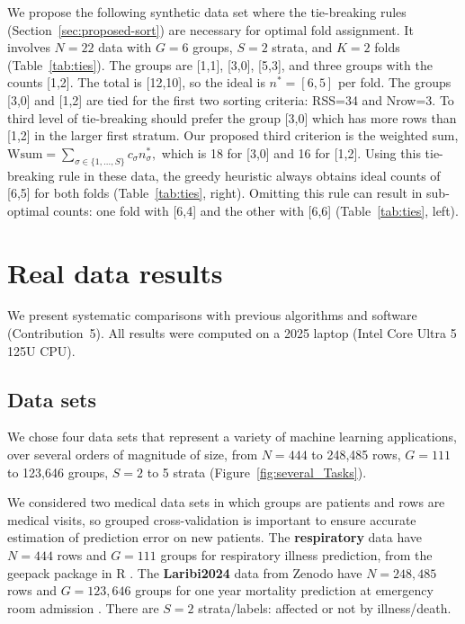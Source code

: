 \documentclass[twoside]{article}
\begin{document}
We propose the following synthetic data set where the tie-breaking rules (Section~\ref{sec:proposed-sort}) are necessary for optimal fold assignment.
It involves $N=22$ data with $G=6$ groups, $S=2$ strata, and $K=2$ folds (Table~\ref{tab:ties}).
The groups are [1,1], [3,0],  [5,3], and three groups with the counts [1,2].
The total is [12,10], so the ideal is $n^*=[6,5]$ per fold.
The groups [3,0] and [1,2] are tied for the first two sorting criteria: RSS=34 and Nrow=3.
To third level of tie-breaking should prefer the group [3,0] which has more rows than [1,2] in the larger first stratum.
Our proposed third criterion is the weighted sum,
$\text{Wsum}=
\sum_{\sigma\in\{1,\dots,S\}}
c_{\sigma}n^*_\sigma,
$
which is 18 for [3,0] and 16 for [1,2].
Using this tie-breaking rule in these data, the greedy heuristic always obtains ideal counts of [6,5] for both folds (Table~\ref{tab:ties}, right).
Omitting this rule can result in sub-optimal counts: one fold with [6,4] and the other with [6,6] (Table~\ref{tab:ties}, left).

\section{Real data results}
\label{sec:results}
We present systematic comparisons with previous algorithms and software (Contribution~5).
All results were computed on a 2025 laptop (Intel Core Ultra 5 125U CPU).

\subsection{Data sets}

We chose four data sets that represent a variety of machine learning applications, over several orders of magnitude of size, from $N=444$ to 248,485 rows, $G=111$ to 123,646 groups, $S=2$ to 5 strata (Figure~\ref{fig:several_Tasks}).

We considered two medical data sets in which groups are patients and rows are medical visits, so grouped cross-validation is important to ensure accurate estimation of prediction error on new patients.
The \textbf{respiratory} data have $N=444$ rows and $G=111$ groups for respiratory illness prediction, from the geepack package in R \citep{Halekoh2006}.
The \textbf{Laribi2024} data from Zenodo \citep{Laribi2024} have $N=248,485$ rows and $G=123,646$ groups for one year mortality prediction at emergency room admission \citep{Laribi2025}.
There are $S=2$ strata/labels: affected or not by illness/death.
\end{document}
